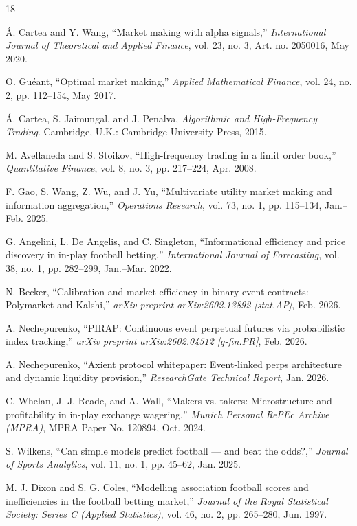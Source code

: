 \documentclass[10pt,twocolumn]{article}
\begin{document}
\begin{thebibliography}{18}
\sloppy

 \'A. Cartea and Y. Wang, ``Market making with alpha signals,'' \textit{International Journal of Theoretical and Applied Finance}, vol. 23, no. 3, Art. no. 2050016, May 2020.

 O. Gu{\'e}ant, ``Optimal market making,'' \textit{Applied Mathematical Finance}, vol. 24, no. 2, pp. 112--154, May 2017.

 \'A. Cartea, S. Jaimungal, and J. Penalva, \textit{Algorithmic and High-Frequency Trading}. Cambridge, U.K.: Cambridge University Press, 2015.

 M. Avellaneda and S. Stoikov, ``High-frequency trading in a limit order book,'' \textit{Quantitative Finance}, vol. 8, no. 3, pp. 217--224, Apr. 2008.

 F. Gao, S. Wang, Z. Wu, and J. Yu, ``Multivariate utility market making and information aggregation,'' \textit{Operations Research}, vol. 73, no. 1, pp. 115--134, Jan.--Feb. 2025.

 G. Angelini, L. De Angelis, and C. Singleton, ``Informational efficiency and price discovery in in-play football betting,'' \textit{International Journal of Forecasting}, vol. 38, no. 1, pp. 282--299, Jan.--Mar. 2022.

 N. Becker, ``Calibration and market efficiency in binary event contracts: Polymarket and Kalshi,'' \textit{arXiv preprint arXiv:2602.13892 [stat.AP]}, Feb. 2026.

 A. Nechepurenko, ``PIRAP: Continuous event perpetual futures via probabilistic index tracking,'' \textit{arXiv preprint arXiv:2602.04512 [q-fin.PR]}, Feb. 2026.

 A. Nechepurenko, ``Axient protocol whitepaper: Event-linked perps architecture and dynamic liquidity provision,'' \textit{ResearchGate Technical Report}, Jan. 2026.

 C. Whelan, J. J. Reade, and A. Wall, ``Makers vs. takers: Microstructure and profitability in in-play exchange wagering,'' \textit{Munich Personal RePEc Archive (MPRA)}, MPRA Paper No. 120894, Oct. 2024.

 S. Wilkens, ``Can simple models predict football --- and beat the odds?,'' \textit{Journal of Sports Analytics}, vol. 11, no. 1, pp. 45--62, Jan. 2025.

 M. J. Dixon and S. G. Coles, ``Modelling association football scores and inefficiencies in the football betting market,'' \textit{Journal of the Royal Statistical Society: Series C (Applied Statistics)}, vol. 46, no. 2, pp. 265--280, Jun. 1997.


\end{thebibliography}
\end{document}
